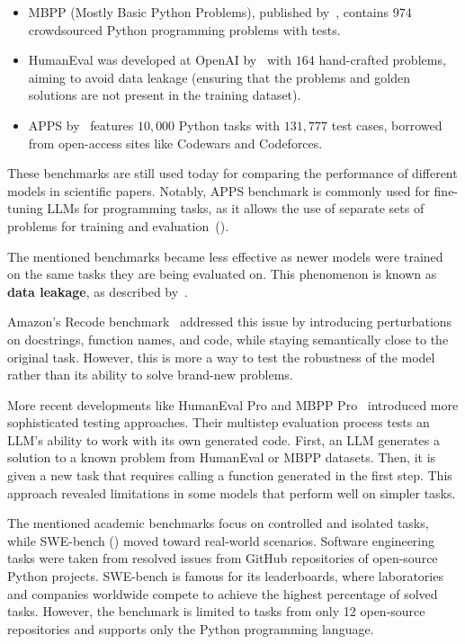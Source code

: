 \begin{itemize}
\item MBPP (Mostly Basic Python Problems), published by~\cite{austin2021program}, contains $974$ crowdsourced Python programming problems with tests.

\item HumanEval was developed at OpenAI by~\cite{chen2021evaluatinglargelanguagemodels} with $164$ hand-crafted problems, aiming to avoid data leakage (ensuring that the problems and golden solutions are not present in the training dataset).

\item APPS by~\cite{hendrycksapps2021} features $10,000$ Python tasks with $131,777$ test cases, borrowed from open-access sites like Codewars and Codeforces.
\end{itemize}
These benchmarks are still used today for comparing the performance of different models in scientific papers.
Notably, APPS benchmark is commonly used for fine-tuning LLMs for programming tasks, as it allows the use of separate sets of problems for training and evaluation~(\cite{bigcode-evaluation-harness}).

The mentioned benchmarks became less effective as newer models were trained on the same tasks they are being evaluated on.
This phenomenon is known as \textbf{data leakage}, as described by~\cite{vendrow2025largelanguagemodelbenchmarks}.

Amazon's Recode benchmark~\cite{recode_wang2022} addressed this issue by introducing perturbations on docstrings, function names, and code, while staying semantically close to the original task.
However, this is more a way to test the robustness of the model rather than its ability to solve brand-new problems.

More recent developments like HumanEval Pro and MBPP Pro~\cite{yu2024humanevalprombpppro} introduced more sophisticated testing approaches.
Their multistep evaluation process tests an LLM's ability to work with its own generated code.
First, an LLM generates a solution to a known problem from HumanEval or MBPP datasets.
Then, it is given a new task that requires calling a function generated in the first step.
This approach revealed limitations in some models that perform well on simpler tasks.

The mentioned academic benchmarks focus on controlled and isolated tasks, while SWE-bench (\cite{jimenez2024swebenchlanguagemodelsresolve}) moved toward real-world scenarios.
Software engineering tasks were taken from resolved issues from GitHub repositories of open-source Python projects.
SWE-bench is famous for its leaderboards, where laboratories and companies worldwide compete to achieve the highest percentage of solved tasks.
However, the benchmark is limited to tasks from only 12 open-source repositories and supports only the Python programming language.


